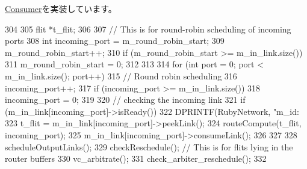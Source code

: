\hyperlink{classConsumer_a623e3e7d1b1c725d70009f7b01a421b9}{Consumer}を実装しています。


\begin{DoxyCode}
304 {
305     flit *t_flit;
306 
307     // This is for round-robin scheduling of incoming ports
308     int incoming_port = m_round_robin_start;
309     m_round_robin_start++;
310     if (m_round_robin_start >= m_in_link.size()) {
311         m_round_robin_start = 0;
312     }
313 
314     for (int port = 0; port < m_in_link.size(); port++) {
315         // Round robin scheduling
316         incoming_port++;
317         if (incoming_port >= m_in_link.size())
318             incoming_port = 0;
319 
320         // checking the incoming link
321         if (m_in_link[incoming_port]->isReady()) {
322             DPRINTF(RubyNetwork, "m_id: %
323             t_flit = m_in_link[incoming_port]->peekLink();
324             routeCompute(t_flit, incoming_port);
325             m_in_link[incoming_port]->consumeLink();
326         }
327     }
328     scheduleOutputLinks();
329     checkReschedule(); // This is for flits lying in the router buffers
330     vc_arbitrate();
331     check_arbiter_reschedule();
332 }
\end{DoxyCode}



